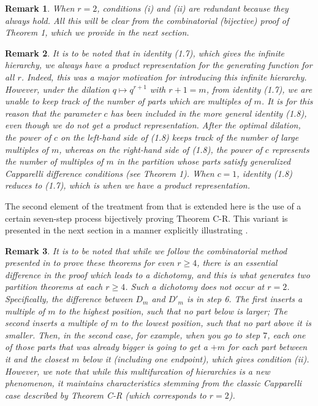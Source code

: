 \documentclass[12pt,a4paper]{amsart}
\newtheorem{remark}{Remark}
\theoremstyle{definition}
\theoremstyle{notation}
\theoremstyle{corollary}
\begin{document}
\begin{remark} When $r=2$, conditions (i) and (ii) are redundant because they always hold. All this will be clear from the combinatorial (bijective) proof of Theorem 1, which we provide in the next section.\end{remark}

\begin{remark}
It is to be noted that in identity (1.7), which gives the infinite hierarchy, we always have a product representation for the generating function for all $r$. Indeed, this was a major motivation for introducing this infinite hierarchy. However, under the dilation $q\mapsto q^{r+1}$ with $r+1=m$, from identity (1.7), we are unable to keep track of the number of parts which are multiples of $m$. It is for this reason that the parameter $c$ has been included in the more general identity (1.8), even though we do not get a product representation. After the optimal dilation, the power of $c$ on the left-hand side of (1.8) keeps track of the number of large multiples of $m$, whereas on the right-hand side of (1.8), the power of $c$ represents the number of multiples of $m$ in the partition whose parts satisfy generalized Capparelli difference conditions (see Theorem 1). When $c=1$, identity (1.8) reduces to (1.7), which is when we have a product representation.
\end{remark}

The second element of the treatment from \cite{KAGEABG95} that is extended here is the use of a certain seven-step process bijectively proving Theorem C-R. This variant is presented in the next section in a manner explicitly illustrating \cite[Thm.~C5]{YAKA25}. 


\begin{remark}It is to be noted that while we follow the combinatorial method presented in \cite{KAGEABG95} to prove these theorems for even $r\ge 4$, there is an essential difference in the proof which leads to a {\it{dichotomy}}, and this is what generates two partition theorems at each $r\ge 4$. Such a dichotomy does not occur at $r=2$. Specifically, the difference between $D_m$ and $D'_m$ is in step 6. The first inserts a multiple of $m$ to the highest position, such that no part below is larger; The second inserts a multiple of $m$ to the lowest position, such that no part above it is smaller. Then, in the second case, for example, when you go to step $7$, each one of those parts that was already bigger is going to get a $+m$ for each part between it and the closest $m$ below it (including one endpoint), which gives condition (ii). However, we note that while this multifurcation of hierarchies is a new phenomenon, it maintains characteristics stemming from the classic Capparelli case described by Theorem C-R (which corresponds to $r=2$).\end{remark}
\end{document}
